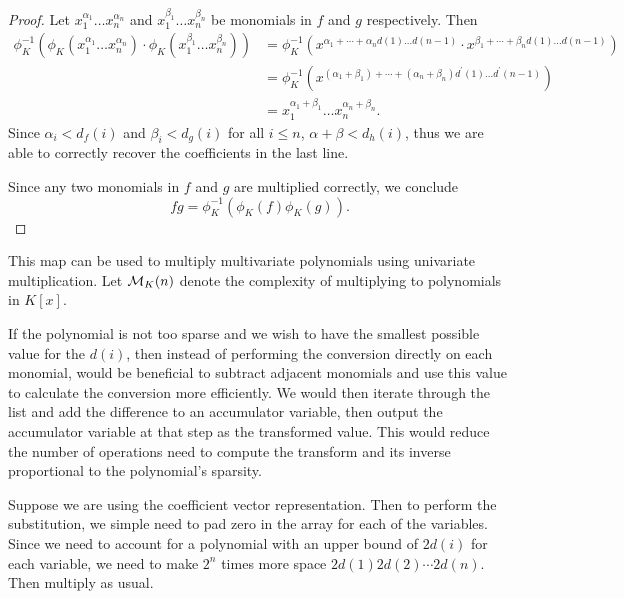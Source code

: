 \begin{proof}
    Let $x_1^{\alpha_1}\ldots x_n^{\alpha_n}$ and $x_1^{\beta_1}\ldots x_n^{\beta_n}$ be monomials in $f$ and $g$ respectively. Then
    \begin{align*}
        \phi_K^{-1}(\phi_K(x_1^{\alpha_1}\ldots x_n^{\alpha_n}) \cdot \phi_K(x_1^{\beta_1}\ldots x_n^{\beta_n})) 
        &= \phi_K^{-1}(x^{\alpha_1 + \cdots  + \alpha_n d(1) \ldots d(n-1)} \cdot x^{\beta_1 + \cdots + \beta_n d(1) \ldots d(n-1)})\\
        &= \phi_K^{-1}(x^{(\alpha_1 + \beta_1) + \cdots + (\alpha_n + \beta_n)d^\prime(1) \ldots d^\prime(n-1)})\\
        &= x_1^{\alpha_1 + \beta_1} \ldots x_n^{\alpha_n + \beta_n}.
    \end{align*}
    Since $\alpha_i < d_f(i)$ and $\beta_i < d_g(i)$ for all $i \le n$, $\alpha + \beta < d_h(i)$, thus we are able to correctly recover the coefficients in the last line.

    Since any two monomials in $f$ and $g$ are multiplied correctly, we conclude
    \[
        f g= \phi^{-1}_K(\phi_K(f) \phi_K(g)).
    \]
\end{proof}

This map can be used to multiply multivariate polynomials using univariate multiplication. Let $\mathcal M_K(n)$ denote the complexity of multiplying to polynomials in $K[x]$. 

If the polynomial is not too sparse and we wish to have the smallest possible value for the $d(i)$, then instead of performing the conversion directly on each monomial, would be beneficial to subtract adjacent monomials and use this value to calculate the conversion more efficiently. We would then iterate through the list and add the difference to an accumulator variable, then output the accumulator variable at that step as the transformed value. This would reduce the number of operations need to compute the transform and its inverse proportional to the polynomial's sparsity. 

Suppose we are using the coefficient vector representation. Then to perform the substitution, we simple need to pad zero in the array for each of the variables. Since we need to account for a polynomial with an upper bound of $2d(i)$ for each variable, we need to make $2^n$ times more space $2d(1)2d(2)\cdots 2d(n)$. Then multiply as usual.

